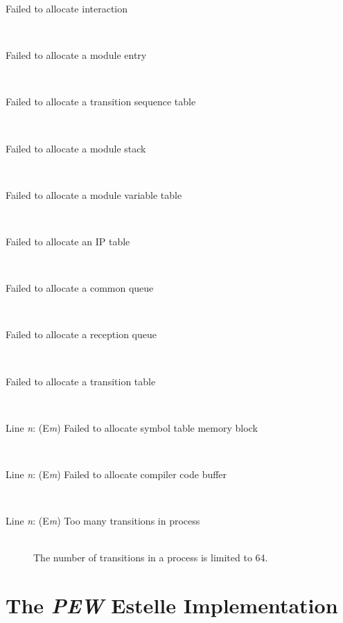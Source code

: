 \begin{description}
\item[Failed to allocate interaction]\mbox{}\\

\item[Failed to allocate a module entry]\mbox{}\\

\item[Failed to allocate a transition sequence table]\mbox{}\\

\item[Failed to allocate a module stack]\mbox{}\\

\item[Failed to allocate a module variable table]\mbox{}\\

\item[Failed to allocate an IP table]\mbox{}\\

\item[Failed to allocate a common queue]\mbox{}\\

\item[Failed to allocate a reception queue]\mbox{}\\

\item[Failed to allocate a transition table]\mbox{}\\

\item[Line {\em n}: (E{\em m}) Failed to allocate symbol table memory block]\mbox{}\\

\item[Line {\em n}: (E{\em m}) Failed to allocate compiler code buffer]\mbox{}\\

\item[Line {\em n}: (E{\em m}) Too many transitions in process]\mbox{}\\

The number of transitions in a process is limited to 64.
\end{description}

\newpage
\appendix
\section[The {\em PEW} Estelle Implementation]{The {\em PEW} Estelle
Implementation}

